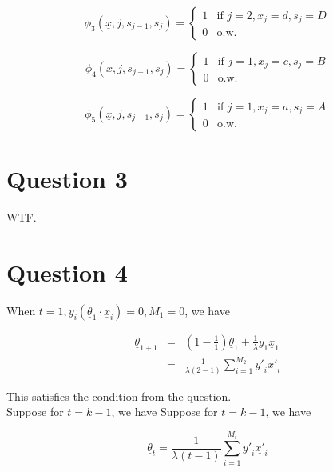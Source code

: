 \documentclass[12pt]{article}
\begin{document}
\begin{equation*}
\phi_3(\underline {x}, j, s_{j-1}, s_j) =
  \begin{cases}
    1 & \text{if } j = 2, x_j = d, s_j = D \\
    0 & \text{o.w.}
  \end{cases}
\end{equation*}

\begin{equation*}
\phi_4(\underline {x}, j, s_{j-1}, s_j) =
  \begin{cases}
    1 & \text{if } j = 1, x_j = c, s_j = B \\
    0 & \text{o.w.}
  \end{cases}
\end{equation*}

\begin{equation*}
\phi_5(\underline {x}, j, s_{j-1}, s_j) =
  \begin{cases}
    1 & \text{if } j = 1, x_j = a, s_j = A \\
    0 & \text{o.w.}
  \end{cases}
\end{equation*}

\section*{Question 3}

WTF.

\section*{Question 4}

When $t=1, y_i(\underline {\theta}_1 \cdot \underline {x}_i) = 0, M_1
= 0$, we have

\begin{eqnarray*}
\underline {\theta}_{1+1} &=& (1 - \frac {1}{1}) \underline {\theta}_1 +
\frac {1}{\lambda} y_1 \underline {x}_1\\
&=& \frac{1}{\lambda(2-1)} \sum_{i=1}^{M_2} {{y'}_i \underline {x'}_i}
\end{eqnarray*}

This satisfies the condition from the question.\\

Suppose for $t = k - 1$, we have
Suppose for $t = k - 1$, we have

\begin{equation*}
  \underline {\theta}_{t} = \frac {1}{\lambda (t-1)} \sum_{i=1}^{M_t}
  {{y'}_i \underline {x'}_i}
\end{equation*}
\end{document}
